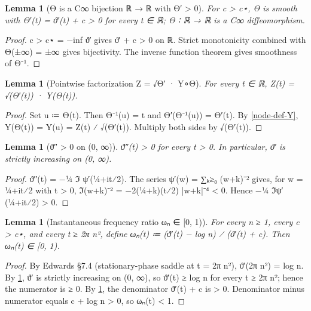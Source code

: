 \documentclass[11pt]{article}
\newtheorem{lemma}[theorem]{Lemma}
\theoremstyle{definition}
\begin{document}
\begin{lemma}[{Θ is a C∞ bijection ℝ → ℝ with Θ′ > 0}]\label{node-lem-Θdiffeo}
For c > c⋆, Θ is smooth with Θ′(t) = ϑ′(t) + c > 0 for every t ∈ ℝ; Θ ∶ ℝ → ℝ is a C∞ diffeomorphism.
\end{lemma}
\begin{proof}
c > c⋆ = −inf ϑ′ gives ϑ′ + c > 0 on ℝ. Strict monotonicity combined with Θ(±∞) = ±∞ gives bijectivity. The inverse function theorem gives smoothness of Θ⁻¹.
\end{proof}

\begin{lemma}[{Pointwise factorization Z = √Θ′ · Y∘Θ}]\label{node-lem-Zfact}
For every t ∈ ℝ, Z(t) = √(Θ′(t)) · Y(Θ(t)).
\end{lemma}
\begin{proof}
Set u ≔ Θ(t). Then Θ⁻¹(u) = t and Θ′(Θ⁻¹(u)) = Θ′(t). By \ref{node-def-Y}, Y(Θ(t)) = Y(u) = Z(t) ⁄ √(Θ′(t)). Multiply both sides by √(Θ′(t)).
\end{proof}

\begin{lemma}[{ϑ″ > 0 on (0, ∞)}]\label{node-lem-ϑ''}
ϑ″(t) > 0 for every t > 0. In particular, ϑ′ is strictly increasing on (0, ∞).
\end{lemma}
\begin{proof}
ϑ″(t) = −¼ ℑ ψ′(¼+it⁄2). The series ψ′(w) = ∑ₖ≥₀ (w+k)⁻² gives, for w = ¼+it⁄2 with t > 0, ℑ(w+k)⁻² = −2(¼+k)(t⁄2) |w+k|⁻⁴ < 0. Hence −¼ ℑψ′(¼+it⁄2) > 0.
\end{proof}

\begin{lemma}[{Instantaneous frequency ratio ωₙ ∈ [0, 1)}]\label{node-lem-ωbound}
For every n ≥ 1, every c > c⋆, and every t ≥ 2π n², define ωₙ(t) ≔ (ϑ′(t) − log n) ⁄ (ϑ′(t) + c). Then ωₙ(t) ∈ [0, 1).
\end{lemma}
\begin{proof}
By Edwards §7.4 (stationary-phase saddle at t = 2π n²), ϑ′(2π n²) = log n. By \ref{node-lem-ϑ''}, ϑ′ is strictly increasing on (0, ∞), so ϑ′(t) ≥ log n for every t ≥ 2π n²; hence the numerator is ≥ 0. By \ref{node-lem-Θdiffeo}, the denominator ϑ′(t) + c is > 0. Denominator minus numerator equals c + log n > 0, so ωₙ(t) < 1.
\end{proof}
\end{document}
